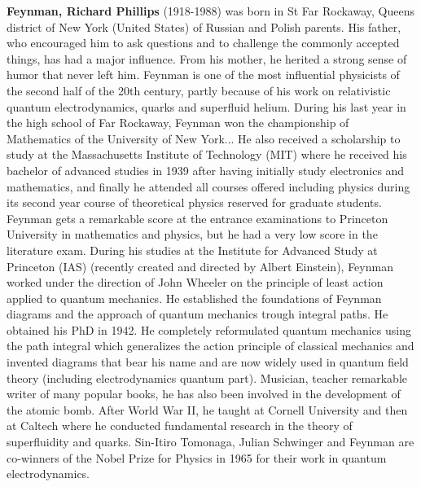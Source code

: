 \textbf{Feynman, Richard Phillips} (1918-1988) was  born in St Far Rockaway, Queens district of New York (United States) of Russian and Polish parents. His father, who encouraged him to ask questions and to challenge the commonly accepted things, has had a major influence. From his mother, he herited a strong sense of humor that never left him. Feynman is one of the most influential physicists of the second half of the 20th century, partly because of his work on relativistic quantum electrodynamics, quarks and superfluid helium. During his last year in the high school of Far Rockaway, Feynman won the championship of Mathematics of the University of New York... He also received a scholarship to study at the Massachusetts Institute of Technology (MIT) where he received his bachelor of advanced studies in 1939 after having initially study electronics and mathematics, and finally he attended all courses offered including physics during its second year course of theoretical physics reserved for graduate students. Feynman gets a remarkable score at the entrance examinations to Princeton University in mathematics and physics, but he had a very low score in the literature exam. During his studies at the Institute for Advanced Study at Princeton (IAS) (recently created and directed by Albert Einstein), Feynman worked under the direction of John Wheeler on the principle of least action applied to quantum mechanics. He established the foundations of Feynman diagrams and the approach of quantum mechanics trough integral paths. He obtained his PhD in 1942. He completely reformulated quantum mechanics using the path integral which generalizes the action principle of classical mechanics and invented diagrams that bear his name and are now widely used in quantum field theory (including electrodynamics quantum part). Musician, teacher remarkable writer of many popular books, he has also been involved in the development of the atomic bomb. After World War II, he taught at Cornell University and then at Caltech where he conducted fundamental research in the theory of superfluidity and quarks. Sin-Itiro Tomonaga, Julian Schwinger and Feynman are co-winners of the Nobel Prize for Physics in 1965 for their work in quantum electrodynamics.

